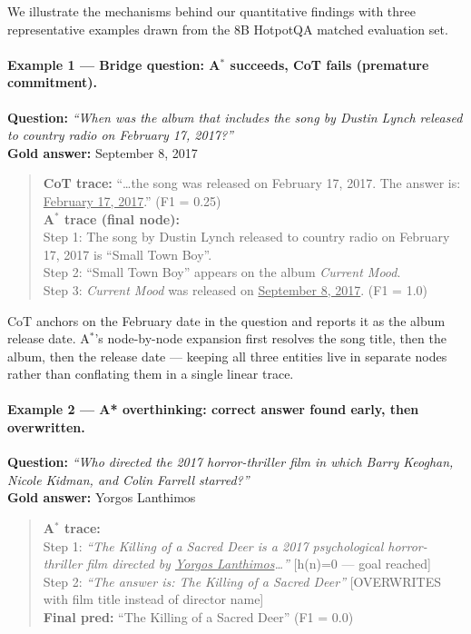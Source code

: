 \documentclass{article}
\newcommand{\astar}{A$^*$\xspace}
\begin{document}
We illustrate the mechanisms behind our quantitative findings with three representative examples drawn from the 8B HotpotQA matched evaluation set.

\paragraph{Example 1 --- Bridge question: \astar succeeds, CoT fails (premature commitment).}
\textbf{Question:} \textit{``When was the album that includes the song by Dustin Lynch released to country radio on February 17, 2017?''}\\
\textbf{Gold answer:} September 8, 2017

\begin{quote}
\textbf{CoT trace:} ``\ldots{}the song was released on February 17, 2017. The answer is: \underline{February 17, 2017}.'' (F1 = 0.25)\\[2pt]
\textbf{\astar trace (final node):}\\
Step 1: The song by Dustin Lynch released to country radio on February 17, 2017 is ``Small Town Boy''.\\
Step 2: ``Small Town Boy'' appears on the album \textit{Current Mood}.\\
Step 3: \textit{Current Mood} was released on \underline{September 8, 2017}. (F1 = 1.0)
\end{quote}

CoT anchors on the February date in the question and reports it as the album release date. \astar's node-by-node expansion first resolves the song title, then the album, then the release date --- keeping all three entities live in separate nodes rather than conflating them in a single linear trace.

\paragraph{Example 2 --- A* overthinking: correct answer found early, then overwritten.}
\textbf{Question:} \textit{``Who directed the 2017 horror-thriller film in which Barry Keoghan, Nicole Kidman, and Colin Farrell starred?''}\\
\textbf{Gold answer:} Yorgos Lanthimos

\begin{quote}
\textbf{\astar trace:}\\
Step 1: \textit{``The Killing of a Sacred Deer is a 2017 psychological horror-thriller film directed by \underline{Yorgos Lanthimos}\ldots''} [h(n)=0 --- goal reached]\\
Step 2: \textit{``The answer is: The Killing of a Sacred Deer''} [OVERWRITES with film title instead of director name]\\
\textbf{Final pred:} ``The Killing of a Sacred Deer'' (F1 = 0.0)
\end{quote}
\end{document}
